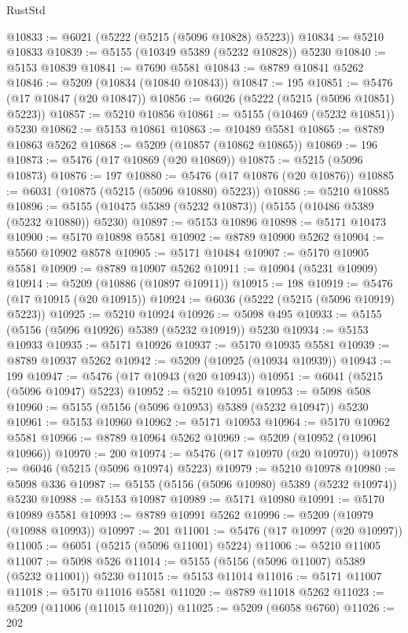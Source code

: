 \begin{lexlean}{RustStd}
\begin{coremodule}
@10833 := @6021 (@5222 (@5215 (@5096 @10828) @5223))
@10834 := @5210 @10833
@10839 := @5155 (@10349 @5389 (@5232 @10828)) @5230
@10840 := @5153 @10839
@10841 := @7690 @5581
@10843 := @8789 @10841 @5262
@10846 := @5209 (@10834 (@10840 @10843))
@10847 := 195
@10851 := @5476 (@17 @10847 (@20 @10847))
@10856 := @6026 (@5222 (@5215 (@5096 @10851) @5223))
@10857 := @5210 @10856
@10861 := @5155 (@10469 (@5232 @10851)) @5230
@10862 := @5153 @10861
@10863 := @10489 @5581
@10865 := @8789 @10863 @5262
@10868 := @5209 (@10857 (@10862 @10865))
@10869 := 196
@10873 := @5476 (@17 @10869 (@20 @10869))
@10875 := @5215 (@5096 @10873)
@10876 := 197
@10880 := @5476 (@17 @10876 (@20 @10876))
@10885 := @6031 (@10875 (@5215 (@5096 @10880) @5223))
@10886 := @5210 @10885
@10896 := @5155 (@10475 @5389 (@5232 @10873)) (@5155 (@10486 @5389 (@5232 @10880)) @5230)
@10897 := @5153 @10896
@10898 := @5171 @10473
@10900 := @5170 @10898 @5581
@10902 := @8789 @10900 @5262
@10904 := @5560 @10902 @8578
@10905 := @5171 @10484
@10907 := @5170 @10905 @5581
@10909 := @8789 @10907 @5262
@10911 := @10904 (@5231 @10909)
@10914 := @5209 (@10886 (@10897 @10911))
@10915 := 198
@10919 := @5476 (@17 @10915 (@20 @10915))
@10924 := @6036 (@5222 (@5215 (@5096 @10919) @5223))
@10925 := @5210 @10924
@10926 := @5098 @495
@10933 := @5155 (@5156 (@5096 @10926) @5389 (@5232 @10919)) @5230
@10934 := @5153 @10933
@10935 := @5171 @10926
@10937 := @5170 @10935 @5581
@10939 := @8789 @10937 @5262
@10942 := @5209 (@10925 (@10934 @10939))
@10943 := 199
@10947 := @5476 (@17 @10943 (@20 @10943))
@10951 := @6041 (@5215 (@5096 @10947) @5223)
@10952 := @5210 @10951
@10953 := @5098 @508
@10960 := @5155 (@5156 (@5096 @10953) @5389 (@5232 @10947)) @5230
@10961 := @5153 @10960
@10962 := @5171 @10953
@10964 := @5170 @10962 @5581
@10966 := @8789 @10964 @5262
@10969 := @5209 (@10952 (@10961 @10966))
@10970 := 200
@10974 := @5476 (@17 @10970 (@20 @10970))
@10978 := @6046 (@5215 (@5096 @10974) @5223)
@10979 := @5210 @10978
@10980 := @5098 @336
@10987 := @5155 (@5156 (@5096 @10980) @5389 (@5232 @10974)) @5230
@10988 := @5153 @10987
@10989 := @5171 @10980
@10991 := @5170 @10989 @5581
@10993 := @8789 @10991 @5262
@10996 := @5209 (@10979 (@10988 @10993))
@10997 := 201
@11001 := @5476 (@17 @10997 (@20 @10997))
@11005 := @6051 (@5215 (@5096 @11001) @5224)
@11006 := @5210 @11005
@11007 := @5098 @526
@11014 := @5155 (@5156 (@5096 @11007) @5389 (@5232 @11001)) @5230
@11015 := @5153 @11014
@11016 := @5171 @11007
@11018 := @5170 @11016 @5581
@11020 := @8789 @11018 @5262
@11023 := @5209 (@11006 (@11015 @11020))
@11025 := @5209 (@6058 @6760)
@11026 := 202

\end{coremodule}
\end{lexlean}
